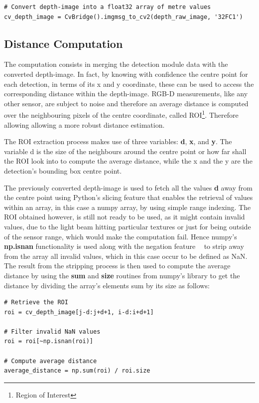 \begin{lstlisting}
# Convert depth-image into a float32 array of metre values
cv_depth_image = CvBridge().imgmsg_to_cv2(depth_raw_image, '32FC1')
\end{lstlisting}

\subsection{Distance Computation}

The computation consists in merging the detection module data with the converted depth-image. In fact, by knowing with confidence the centre point for each detection, in terms of its x and y coordinate, these can be used to access the corresponding distance within the depth-image. RGB-D measurements, like any other sensor, are subject to noise and therefore an average distance is computed over the neighbouring pixels of the centre coordinate, called ROI\footnote{Region of Interest}. Therefore allowing allowing a more robust distance estimation.

The ROI extraction process makes use of three variables: \textbf{d}, \textbf{x}, and \textbf{y}. The variable d is the size of the neighbours around the centre point or how far shall the ROI look into to compute the average distance, while the x and the y are the detection's bounding box centre point.

The previously converted depth-image is used to fetch all the values \textbf{d} away from the centre point using Python's slicing feature that enables the retrieval of values within an array, in this case a numpy array, by using simple range indexing. The ROI obtained however, is still not ready to be used, as it might contain invalid values, due to the light beam hitting particular textures or just for being outside of the sensor range, which would make the computation fail. Hence numpy's \textbf{np.isnan} functionality is used along with the negation feature \textbf{~} to strip away from the array all invalid values, which in this case occur to be defined as NaN. The result from the stripping process is then used to compute the average distance by using the \textbf{sum} and \textbf{size} routines from numpy's library to get the distance by dividing the array's elements sum by its size as follows:

\begin{lstlisting}
# Retrieve the ROI
roi = cv_depth_image[j-d:j+d+1, i-d:i+d+1]
    
# Filter invalid NaN values
roi = roi[~np.isnan(roi)]
    
# Compute average distance
average_distance = np.sum(roi) / roi.size
\end{lstlisting}

